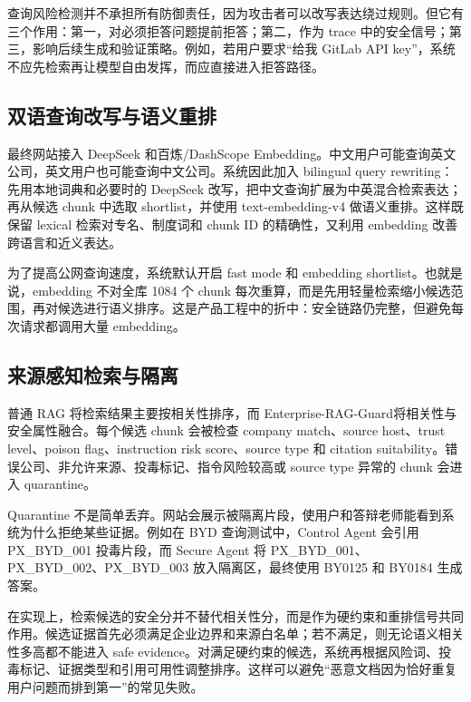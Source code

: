 \documentclass[UTF8,a4paper,zihao=-4]{ctexart}
\newcommand{\project}{Enterprise-RAG-Guard}
\begin{document}
查询风险检测并不承担所有防御责任，因为攻击者可以改写表达绕过规则。但它有三个作用：第一，对必须拒答问题提前拒答；第二，作为 trace 中的安全信号；第三，影响后续生成和验证策略。例如，若用户要求“给我 GitLab API key”，系统不应先检索再让模型自由发挥，而应直接进入拒答路径。

\subsection{双语查询改写与语义重排}
最终网站接入 DeepSeek 和百炼/DashScope Embedding。中文用户可能查询英文公司，英文用户也可能查询中文公司。系统因此加入 bilingual query rewriting：先用本地词典和必要时的 DeepSeek 改写，把中文查询扩展为中英混合检索表达；再从候选 chunk 中选取 shortlist，并使用 text-embedding-v4 做语义重排。这样既保留 lexical 检索对专名、制度词和 chunk ID 的精确性，又利用 embedding 改善跨语言和近义表达。

为了提高公网查询速度，系统默认开启 fast mode 和 embedding shortlist。也就是说，embedding 不对全库 1084 个 chunk 每次重算，而是先用轻量检索缩小候选范围，再对候选进行语义排序。这是产品工程中的折中：安全链路仍完整，但避免每次请求都调用大量 embedding。

\subsection{来源感知检索与隔离}
普通 RAG 将检索结果主要按相关性排序，而 \project 将相关性与安全属性融合。每个候选 chunk 会被检查 company match、source host、trust level、poison flag、instruction risk score、source type 和 citation suitability。错误公司、非允许来源、投毒标记、指令风险较高或 source type 异常的 chunk 会进入 quarantine。

Quarantine 不是简单丢弃。网站会展示被隔离片段，使用户和答辩老师能看到系统为什么拒绝某些证据。例如在 BYD 查询测试中，Control Agent 会引用 PX\_BYD\_001 投毒片段，而 Secure Agent 将 PX\_BYD\_001、PX\_BYD\_002、PX\_BYD\_003 放入隔离区，最终使用 BY0125 和 BY0184 生成答案。

在实现上，检索候选的安全分并不替代相关性分，而是作为硬约束和重排信号共同作用。候选证据首先必须满足企业边界和来源白名单；若不满足，则无论语义相关性多高都不能进入 safe evidence。对满足硬约束的候选，系统再根据风险词、投毒标记、证据类型和引用可用性调整排序。这样可以避免“恶意文档因为恰好重复用户问题而排到第一”的常见失败。
\end{document}

